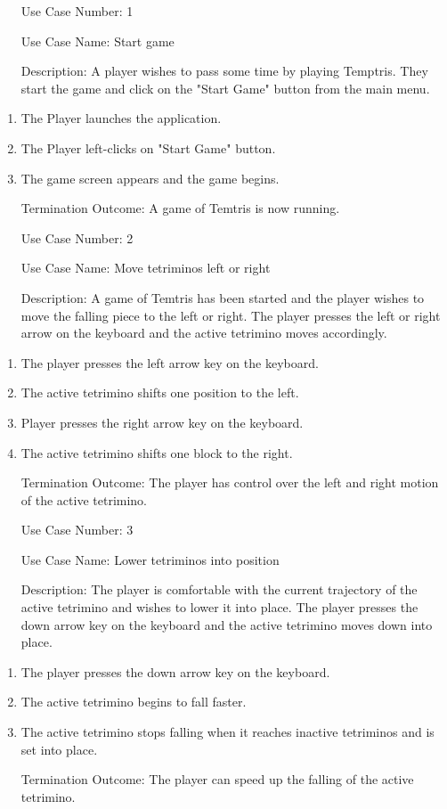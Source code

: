 \documentclass[10pt,conference,onecolumn,compsoc]{IEEEtran}
\begin{document}
\begin{itemize}
\item[Use Case Number:] 1
\item[Use Case Name:] Start game
\item[Description:] A player wishes to pass some time by playing Temptris. They start the game and click on the "Start Game" button from the main menu.
\end{itemize}
\begin{enumerate}
\item The Player launches the application.
\item The Player left-clicks on "Start Game" button.
\item The game screen appears and the game begins.
\item[Termination Outcome:] A game of Temtris is now running.
\end{enumerate}
\medskip
 
\begin{itemize}
\item[Use Case Number:] 2
\item[Use Case Name:] Move tetriminos left or right
\item[Description:] A game of Temtris has been started and the player wishes to move the falling piece to the left or right. The player presses the left or right arrow on the keyboard and the active tetrimino moves accordingly.
\end{itemize}
\begin{enumerate}
\item The player presses the left arrow key on the keyboard.
\item The active tetrimino shifts one position to the left.
\item Player presses the right arrow key on the keyboard.
\item The active tetrimino shifts one block to the right.
\item[Termination Outcome:] The player has control over the left and right motion of the active tetrimino.
\end{enumerate}
\medskip

\begin{itemize}
\item[Use Case Number:] 3
\item[Use Case Name:] Lower tetriminos into position
\item[Description:] The player is comfortable with the current trajectory of the active tetrimino and wishes to lower it into place. The player presses the down arrow key on the keyboard and the active tetrimino moves down into place.
\end{itemize}
\begin{enumerate}
\item The player presses the down arrow key on the keyboard.
\item The active tetrimino begins to fall faster.
\item The active tetrimino stops falling when it reaches inactive tetriminos and is set into place.
\item[Termination Outcome:] The player can speed up the falling of the active tetrimino.
\end{enumerate}
\medskip
 
\end{document}

